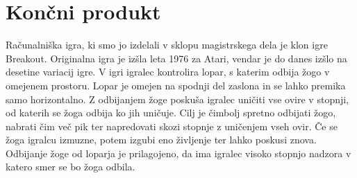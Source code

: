 \documentclass[12pt,a4paper,twoside]{book}
\begin{document}
\section{Končni produkt}
Računalniška igra, ki smo jo izdelali v sklopu magistrskega dela je klon igre Breakout. Originalna igra je izšla leta 1976 za Atari, vendar je do danes izšlo na desetine variacij igre. V igri igralec kontrolira lopar, s katerim odbija žogo v omejenem prostoru. Lopar je omejen na spodnji del zaslona in se lahko premika samo horizontalno. Z odbijanjem žoge poskuša igralec uničiti vse ovire v stopnji, od katerih se žoga odbija ko jih uničuje. Cilj je čimbolj spretno odbijati žogo, nabrati čim več pik ter napredovati skozi stopnje z uničenjem vseh ovir. Če se žoga igralcu izmuzne, potem izgubi eno življenje ter lahko poskusi znova. Odbijanje žoge od loparja je prilagojeno, da ima igralec visoko stopnjo nadzora v katero smer se bo žoga odbila.
\end{document}
